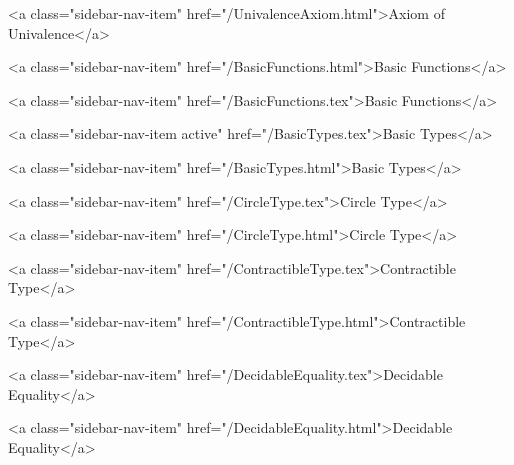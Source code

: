           <a class="sidebar-nav-item" href="/UnivalenceAxiom.html">Axiom of Univalence</a>
        
      
    
      
        
          <a class="sidebar-nav-item" href="/BasicFunctions.html">Basic Functions</a>
        
      
    
      
        
          <a class="sidebar-nav-item" href="/BasicFunctions.tex">Basic Functions</a>
        
      
    
      
        
          <a class="sidebar-nav-item active" href="/BasicTypes.tex">Basic Types</a>
        
      
    
      
        
          <a class="sidebar-nav-item" href="/BasicTypes.html">Basic Types</a>
        
      
    
      
        
          <a class="sidebar-nav-item" href="/CircleType.tex">Circle Type</a>
        
      
    
      
        
          <a class="sidebar-nav-item" href="/CircleType.html">Circle Type</a>
        
      
    
      
        
          <a class="sidebar-nav-item" href="/ContractibleType.tex">Contractible Type</a>
        
      
    
      
        
          <a class="sidebar-nav-item" href="/ContractibleType.html">Contractible Type</a>
        
      
    
      
        
          <a class="sidebar-nav-item" href="/DecidableEquality.tex">Decidable Equality</a>
        
      
    
      
        
          <a class="sidebar-nav-item" href="/DecidableEquality.html">Decidable Equality</a>
        
      
    
